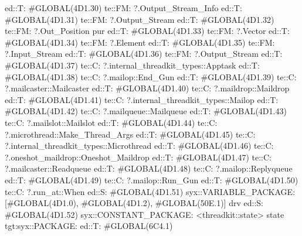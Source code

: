                                     ed::T: #GLOBAL(4D1.30) te::FM: ?.Output_Stream_Info
                                    ed::T: #GLOBAL(4D1.31) te::FM: ?.Output_Stream
                                    ed::T: #GLOBAL(4D1.32) te::FM: ?.Out_Position
                             pur
                        ed::T: #GLOBAL(4D1.33) te::FM: ?.Vector
                        ed::T: #GLOBAL(4D1.34) te::FM: ?.Element
                        ed::T: #GLOBAL(4D1.35) te::FM: ?.Input_Stream
                        ed::T: #GLOBAL(4D1.36) te::FM: ?.Output_Stream
                    ed::T: #GLOBAL(4D1.37)
                     te::C:
                     ?.internal_threadkit_types::Apptask
                    ed::T: #GLOBAL(4D1.38)
                     te::C:
                     ?.mailop::End_Gun
                    ed::T: #GLOBAL(4D1.39)
                     te::C:
                     ?.mailcaster::Mailcaster
                    ed::T: #GLOBAL(4D1.40)
                     te::C:
                     ?.maildrop::Maildrop
                    ed::T: #GLOBAL(4D1.41)
                     te::C:
                     ?.internal_threadkit_types::Mailop
                    ed::T: #GLOBAL(4D1.42)
                     te::C:
                     ?.mailqueue::Mailqueue
                    ed::T: #GLOBAL(4D1.43)
                     te::C:
                     ?.mailslot::Mailslot
                    ed::T: #GLOBAL(4D1.44)
                     te::C:
                     ?.microthread::Make_Thread_Args
                    ed::T: #GLOBAL(4D1.45)
                     te::C:
                     ?.internal_threadkit_types::Microthread
                    ed::T: #GLOBAL(4D1.46)
                     te::C:
                     ?.oneshot_maildrop::Oneshot_Maildrop
                    ed::T: #GLOBAL(4D1.47)
                     te::C:
                     ?.mailcaster::Readqueue
                    ed::T: #GLOBAL(4D1.48)
                     te::C:
                     ?.mailop::Replyqueue
                    ed::T: #GLOBAL(4D1.49)
                     te::C:
                     ?.mailop::Run_Gun
                    ed::T: #GLOBAL(4D1.50)
                     te::C:
                     ?.run_at::When
                    ed::S: #GLOBAL(4D1.51)
                     syx::VARIABLE_PACKAGE:
                     [#GLOBAL(4D1.0), #GLOBAL(4D1.2), #GLOBAL(50E.1)]
                     drv
                    ed::S: #GLOBAL(4D1.52)
                     syx::CONSTANT_PACKAGE:
                     <threadkit::state>
                     state
                tgt:syx::PACKAGE:
                    ed::T: #GLOBAL(6C4.1)
